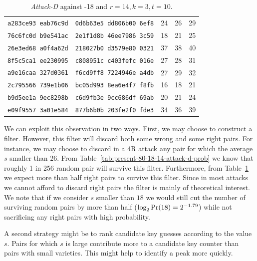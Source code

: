 \begin{table}[ht]
\begin{center}
\begin{tabular}{|c|c|r|r|r|}
\texttt{a283ce93 eab76c9d} & \texttt{0d6b63e5 dd806b00 6ef8} & 24 & 26 & 29\\
\texttt{76c6fc0d b9e541ac} & \texttt{2e1f1d8b 46ee7986 3c59} & 18 & 21 & 25\\
\texttt{26e3ed68 a0f4a62d} & \texttt{218027b0 d3579e80 0321} & 37 & 38 & 40\\
\texttt{8f5c5ca1 ee230995} & \texttt{c808951c c403fefc 016e} & 27 & 28 & 31\\
\texttt{a9e16caa 327d0361} & \texttt{f6cd9ff8 7224946e a4db} & 27 & 29 & 32\\
\texttt{2c795566 739e1b06} & \texttt{bc05d993 8ea6e4f7 f8fb} & 16 & 18 & 21\\
\texttt{b9d5ee1a 9ec8298b} & \texttt{c6d9fb3e 9cc686df 69ab} & 20 & 21 & 24\\
\texttt{e09f9557 3a01e584} & \texttt{877b6b0b 203fe2f0 fde3} & 34 & 36 & 39\\
\hline
\end{tabular}
\end{center}
\caption{\emph{Attack-D} against -18 and $r=14,k=3,t=10$.}
\label{tab:present-80-18-attack-d}
\end{table}

We can exploit this observation in two ways. First, we may choose to construct a filter. However, this filter will discard both some wrong and some right pairs. For instance, we may choose to discard in a 4R attack any pair for which the average $s$ smaller than $26$. From Table~\ref{tab:present-80-18-14-attack-d-prob} we know that roughly 1 in 256 random pair will survive this filter. Furthermore, from Table~\ref{tab:present-80-18-attack-d} we expect more than half right pairs to survive this filter. Since in most attacks we cannot afford to discard right pairs the filter is mainly of theoretical interest. We note that if we consider $s$ smaller than $18$ we would still cut the number of surviving random pairs by more than half ($\log_2 \textnormal{Pr}(18) = 2^{-1.79}$) while not sacrificing any right pairs with high probability.

A second strategy might be to rank candidate key guesses according to the value $s$. Pairs for which $s$ is large contribute more to a candidate key counter than pairs with small varieties. This might help to identify a peak more quickly.

